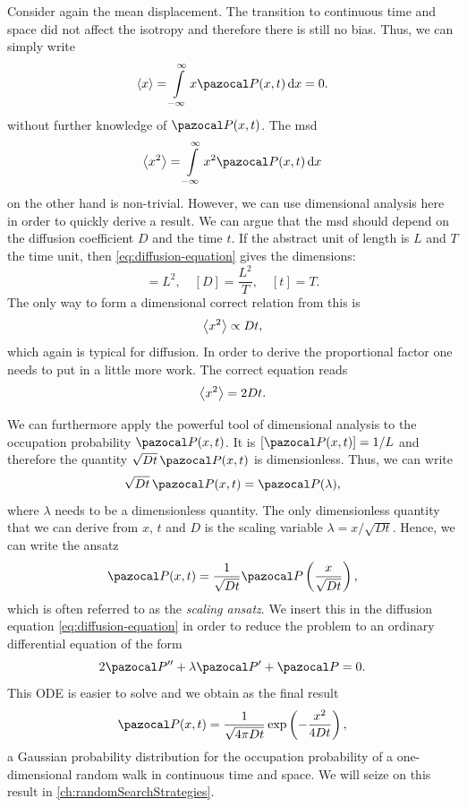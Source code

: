Consider again the mean displacement. The transition to continuous time and space did not affect the isotropy and therefore there is still no bias. Thus, we can simply write
\begin{equation*}
 \avg{x} = \int\limits_{-\infty}^\infty x \P(x, t) \diff x = 0.
\end{equation*}
without further knowledge of $\P(x, t)$. The \ac{msd}
\begin{equation*}
 \avg{x^2} = \int\limits_{-\infty}^\infty x^2 \P(x, t) \diff x
\end{equation*}
on the other hand is non-trivial. However, we can use dimensional analysis here in order to quickly derive a result. We can argue that the \ac{msd} should depend on the diffusion coefficient $D$ and the time $t$. If the abstract unit of length is $L$ and $T$ the time unit, then \autoref{eq:diffusion-equation} gives the dimensions:
\begin{equation*}
 [\avg{x^2}] = L^2, \quad [D] = \dfrac{L^2}{T}, \quad [t] = T.
\end{equation*}
The only way to form a dimensional correct relation from this is
\begin{equation*}
 \left<x^2\right> \propto Dt,
\end{equation*}
which again is typical for diffusion. In order to derive the proportional factor one needs to put in a little more work. The correct equation reads
\begin{equation*}
 \left<x^2\right> = 2Dt.
\end{equation*}

We can furthermore apply the powerful tool of dimensional analysis to the occupation probability $\P(x, t)$. It is $[\P(x, t)] = 1/L$ and therefore the quantity $\sqrt{Dt} \, \P(x, t)$ is dimensionless. Thus, we can write
\begin{equation*}
 \sqrt{Dt} \, \P(x, t) = \P(\lambda),
\end{equation*}
where $\lambda$ needs to be a dimensionless quantity. The only dimensionless quantity that we can derive from $x$, $t$ and $D$ is the scaling variable $\lambda = x / \sqrt{Dt}$.  Hence, we can write the ansatz
\begin{equation*}
 \P(x, t) = \dfrac{1}{\sqrt{Dt}} \P\left(\dfrac{x}{\sqrt{Dt}}\right),
\end{equation*}
which is often referred to as the \textit{scaling ansatz}. We insert this in the diffusion equation \ref{eq:diffusion-equation} in order to reduce the problem to an ordinary differential equation of the form
\begin{equation*}
 2\P'' + \lambda \P' + \P = 0.
\end{equation*}
This ODE is easier to solve and we obtain as the final result 
\begin{equation}\label{eq:gauss-distr}
 \P(x, t) = \dfrac{1}{\sqrt{4 \pi Dt}} \exp\left(-\dfrac{x^2}{4Dt}\right),
\end{equation}
a Gaussian probability distribution for the occupation probability of a one-dimensional random walk in continuous time and space. We will seize on this result in \autoref{ch:randomSearchStrategies}.


